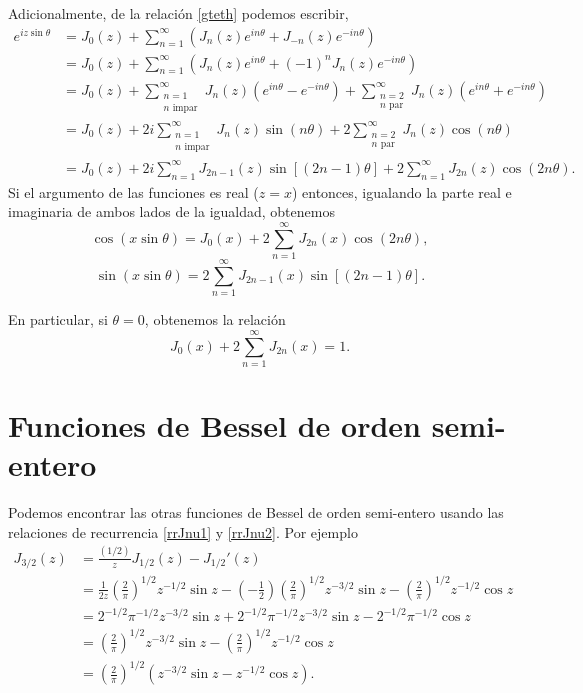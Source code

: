 Adicionalmente, de la relación \eqref{gteth} podemos escribir,
\begin{align}
e^{iz\sin\theta} &= J_0(z)+\sum_{n=1}^\infty\left(J_n(z) e^{in\theta}+J_{-n}(z) e^{-in\theta}\right) \\
&=  J_0(z)+\sum_{n=1}^\infty\left(J_n(z) e^{in\theta}+(-1)^nJ_{n}(z) e^{-in\theta}\right) \\
&=  J_0(z)+\sum_{\substack{n=1 \\ n \text{ impar}}}^\infty J_n(z)\left(e^{in\theta}-e^{-in\theta}\right)+\sum_{\substack{n=2 \\ n \text{ par}}}^\infty J_n(z)\left(e^{in\theta}+e^{-in\theta}\right) \\
&=  J_0(z)+2i\sum_{\substack{n=1 \\ n \text{ impar}}}^\infty J_n(z)\sin(n\theta) +2\sum_{\substack{n=2 \\ n \text{ par}}}^\infty J_n(z)\cos(n\theta) \\
&=  J_0(z)+2i\sum_{n=1}^\infty J_{2n-1}(z)\sin[(2n-1)\theta] +2\sum_{n=1}^\infty J_{2n}(z)\cos(2n\theta).
\end{align}
Si el argumento de las funciones es real ($z=x$) entonces, igualando la parte real e imaginaria de ambos lados de la igualdad, obtenemos
\begin{equation}
\boxed{\cos(x\sin\theta)=J_0(x)+2\sum_{n=1}^\infty J_{2n}(x)\cos(2n\theta),}
\end{equation}
\begin{equation}
\boxed{\sin(x\sin\theta)=2\sum_{n=1}^\infty J_{2n-1}(x)\sin[(2n-1)\theta].}
\end{equation}

En particular, si $\theta=0$, obtenemos la relación
\begin{equation}
J_0(x)+2\sum_{n=1}^\infty J_{2n}(x)=1.
\end{equation}

\section{Funciones de Bessel de orden semi-entero}


Podemos encontrar las otras funciones de Bessel de orden semi-entero usando las relaciones de recurrencia \eqref{rrJnu1} y \eqref{rrJnu2}. Por ejemplo
\begin{align}
    J_{3/2}(z)
    &= \frac{(1/2)}{z} J_{1/2}(z) - J_{1/2}'(z) 
    \\
    &= \frac{1}{2z} \left( \frac{2}{\pi} \right)^{1/2} z^{-1/2} \sin z
    - \left(-\frac{1}{2}\right) \left(\frac{2}{\pi}\right)^{1/2}
    z^{-3/2} \sin z - \left(\frac{2}{\pi}\right)^{1/2} z^{-1/2}
    \cos z 
    \\
    &= 2^{-1/2} \pi^{-1/2} z^{-3/2} \sin z
    + 2^{-1/2} \pi^{-1/2} z^{-3/2} \sin z
    - 2^{-1/2} \pi^{-1/2} \cos z 
    \\
    &= \left(\frac{2}{\pi}\right)^{1/2} z^{-3/2} \sin z
    - \left(\frac{2}{\pi}\right)^{1/2} z^{-1/2} \cos z 
    \\
    &= \left(\frac{2}{\pi}\right)^{1/2} \left( z^{-3/2} \sin z
      - z^{-1/2} \cos z \right).
  \end{align}



